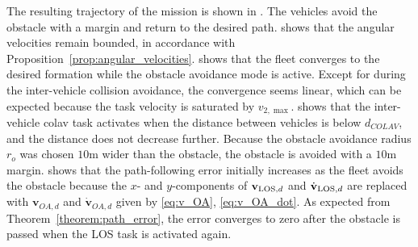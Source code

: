 The resulting trajectory of the mission is shown in . The vehicles avoid the obstacle with a margin and return to the desired path.  shows that the angular velocities remain bounded, in accordance with Proposition~\ref{prop:angular_velocities}.  shows that the fleet converges to the desired formation while the obstacle avoidance mode is active. Except for during the inter-vehicle collision avoidance, the convergence seems linear, which can be expected because the task velocity is saturated by $v_{2,\max}$.  shows that the inter-vehicle \gls{colav} task activates when the distance between vehicles is below $d_{COLAV}$, and the distance does not decrease further. Because the obstacle avoidance radius $r_o$ was chosen $10 \mathrm{m}$ wider than the obstacle, the obstacle is avoided with a $10 \mathrm{m}$ margin.  shows that the path-following error initially increases as the fleet avoids the obstacle because the $x$- and $y$-components of $\mathbf{v}_{{\rm LOS}, d}$ and $\dot{\mathbf{v}}_{{\rm LOS}, d}$ are replaced with $\mathbf{v}_{OA,d}$ and $\dot{\mathbf{v}}_{OA,d}$ given by \eqref{eq:v_OA}, \eqref{eq:v_OA_dot}. As expected from Theorem~\ref{theorem:path_error}, the error converges to zero after the obstacle is passed when the LOS task is activated again.
